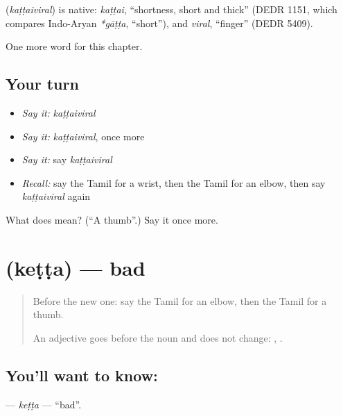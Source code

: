 \begin{cousinweb}
\textbf{} (\emph{kaṭṭaiviral}) is native: \emph{kaṭṭai}, \textquotedblleft{}shortness, short and thick\textquotedblright{} (DEDR 1151, which compares Indo-Aryan \emph{*gāṭṭa}, \textquotedblleft{}short\textquotedblright{}), and \emph{viral}, \textquotedblleft{}finger\textquotedblright{} (DEDR 5409).
\end{cousinweb}

\begin{grammarlens}[title={What you've built}]
One more word for this chapter.
\end{grammarlens}

\subsection*{Your turn}
\begin{itemize}
\raggedright
  \item \emph{Say it:} \emph{kaṭṭaiviral}
  \item \emph{Say it:} \emph{kaṭṭaiviral}, once more
  \item \emph{Say it:} say \emph{kaṭṭaiviral}
  \item \emph{Recall:} say the Tamil for a wrist, then the Tamil for an elbow, then say \emph{kaṭṭaiviral} again
\end{itemize}

\begin{tcolorbox}[breakable,colback=teal!4,colframe=teal!35!black,title={Before you move on}]
What does  mean? (\textquotedblleft{}A thumb\textquotedblright{}.) Say it once more.
\end{tcolorbox}
\section[\texorpdfstring{\ta{கெட்ட} (keṭṭa)}{கெட்ட (keṭṭa)}]{ (keṭṭa) — bad}

\label{lesson:TA-C143-ketta}



\begin{quote}
Before the new one: say the Tamil for an elbow, then the Tamil for a thumb.

An adjective goes before the noun and does not change: \textbf{ }, \textbf{ }.
\end{quote}

\subsection*{You'll want to know: }
\textbf{} — \emph{keṭṭa} — \textquotedblleft{}bad\textquotedblright{}.


